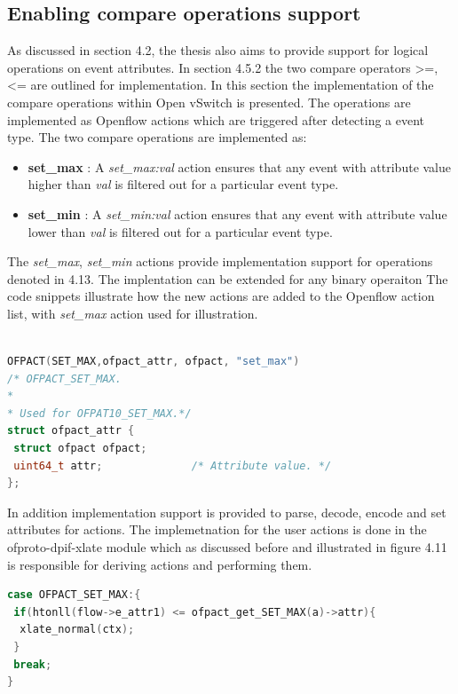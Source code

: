 \subsection{Enabling compare operations support}
As discussed in section 4.2, the thesis also aims to provide support for logical operations on event attributes. In section 4.5.2 the two compare operators {>=, <=} are outlined for implementation. In this section the implementation of the compare operations within Open vSwitch is presented. The operations are implemented as Openflow actions which are triggered after detecting a event type. The two compare operations are implemented as:
\begin{itemize}
 \item \textbf{set_max} : A \textit{set_max:val} action ensures that any event with attribute value higher than \textit{val} is filtered out for a particular event type.
 \item \textbf{set_min} : A \textit{set_min:val} action ensures that any event with attribute value lower than \textit{val} is filtered out for a particular event type.
\end{itemize}
The \textit{set_max}, \textit{set_min} actions provide implementation support for operations denoted in 4.13. The implentation can be extended for any binary operaiton The code snippets illustrate  how the new actions are added to the Openflow action list, with \textit{set_max} action used for illustration. \newline

\begin{lstlisting}[language=c]

OFPACT(SET_MAX,ofpact_attr, ofpact, "set_max")      
/* OFPACT_SET_MAX.
*
* Used for OFPAT10_SET_MAX.*/
struct ofpact_attr {
 struct ofpact ofpact;
 uint64_t attr;              /* Attribute value. */
};
\end{lstlisting}

In addition implementation support is provided to parse, decode, encode and set attributes for actions. The implemetnation for the user actions is done in the ofproto-dpif-xlate module which as discussed before and illustrated in figure 4.11 is responsible for deriving actions and performing them. \newline
\begin{lstlisting}[language=c]
case OFPACT_SET_MAX:{        
 if(htonll(flow->e_attr1) <= ofpact_get_SET_MAX(a)->attr){
  xlate_normal(ctx);
 }
 break;    
}
\end{lstlisting}

